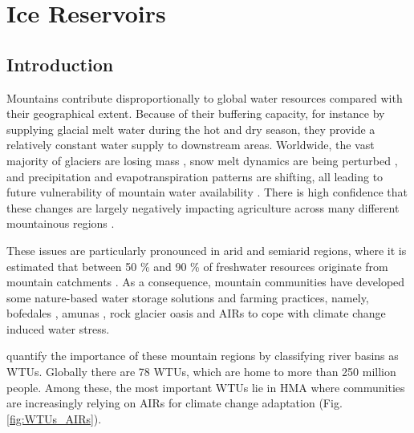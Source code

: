 \chapter{Ice Reservoirs}



\section{Introduction}

Mountains contribute disproportionally to global water resources compared with their geographical extent.
Because of their buffering capacity, for instance by supplying glacial melt water during the hot and dry season,
they provide a relatively constant water supply to downstream areas. Worldwide, the vast majority of glaciers
are losing mass \citep{zempGlobalGlacierMass2019a}, snow melt dynamics are being perturbed
\citep{mukhopadhyayReevaluationSnowmeltGlacial2015, hammondGlobalSnowZone2018}, and precipitation and
evapotranspiration patterns are shifting, all leading to future vulnerability of mountain water availability
\citep{lutzConsistentIncreaseHigh2014}. There is high confidence that these changes are largely negatively
impacting agriculture across many different mountainous regions \citep{ipccCrossChapterPaperMountains2022}.

These issues are particularly pronounced in arid and semiarid regions, where it is estimated that between 50 \%
and 90 \% of freshwater resources originate from mountain catchments
\citep{mukhopadhyayReevaluationSnowmeltGlacial2015, messerliMountainsWorldVulnerable2004}. As a consequence,
mountain communities have developed some nature-based water storage solutions and farming practices, namely,
bofedales \citep{monge-salazarEcohydrologyEcosystemServices2022}, amunas
\citep{ochoa-tocachiPotentialContributionsPreInca2019}, rock glacier oasis \citep{pandeyRockGlacierOasis2022}
and \ac{AIRs} \citep{wangchukIceStupaCompetition2020} to cope with climate change induced water stress.

\citet{immerzeelImportanceVulnerabilityWorld2020} quantify the importance of these mountain regions by
classifying river basins as \ac{WTUs}. Globally there are 78 \ac{WTUs}, which are home to more than 250 million
people. Among these, the most important WTUs lie in \ac{HMA} where communities are increasingly relying on
\ac{AIRs} for climate change adaptation (Fig. \ref{fig:WTUs_AIRs}). 

